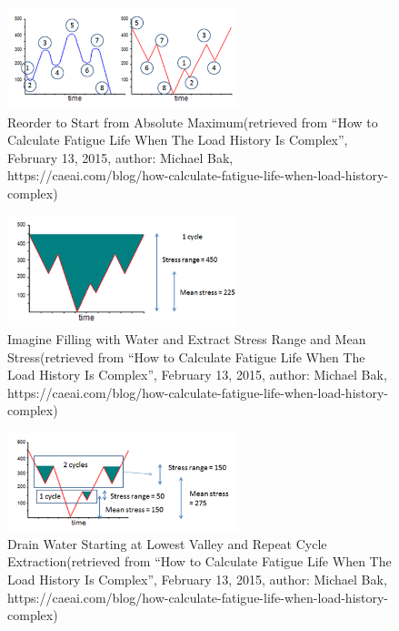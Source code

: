 \begin{figure}[h!]
	\centering
	\includegraphics[width=0.6\textwidth]{figures//Reorder.png} 
	\caption{Reorder to Start from Absolute Maximum(retrieved  from ``How to Calculate Fatigue Life When The Load History Is Complex'', February 13, 2015, author: Michael Bak, https://caeai.com/blog/how-calculate-fatigue-life-when-load-history-complex)}
	\label{Reorder}
\end{figure}

\begin{figure}[h!]
	\centering
	\includegraphics[width=0.6\textwidth]{figures//StressRange.png} 
	\caption{Imagine Filling with Water and Extract Stress Range and Mean Stress(retrieved  from ``How to Calculate Fatigue Life When The Load History Is Complex'', February 13, 2015, author: Michael Bak, https://caeai.com/blog/how-calculate-fatigue-life-when-load-history-complex)}
	\label{StressRange}
\end{figure}

\begin{figure}[h!]
	\centering
	\includegraphics[width=0.6\textwidth]{figures//DrainWater.png} 
	\caption{Drain Water Starting at Lowest Valley and Repeat Cycle Extraction(retrieved  from ``How to Calculate Fatigue Life When The Load History Is Complex'', February 13, 2015, author: Michael Bak, https://caeai.com/blog/how-calculate-fatigue-life-when-load-history-complex)}
	\label{DrainWater}
\end{figure}   


